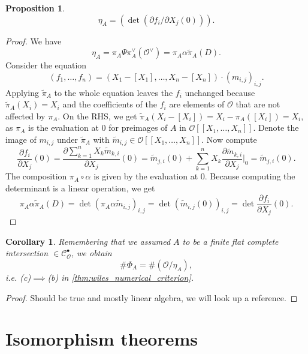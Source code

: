\documentclass{article}
\theoremstyle{plain}%
\newtheorem{proposition}{Proposition}[section]
\newtheorem{corollary}{Corollary}[section]
\theoremstyle{definition}
\theoremstyle{remark}
\newcommand{\cob}{\mathcal{C}_\mathcal{O}^\bullet}
\begin{document}
\begin{proposition}\cite[proposition 5.19]{darmon1995fermat}
    \[
        \eta_A = (\det(\partial f_i/\partial X_j(0))).
    \]
\end{proposition}
\begin{proof}
    We have \[
        \eta_A = \pi_A \Psi \pi_A^\vee(\mathcal{O}^\vee) = \pi_A\alpha \tilde \pi_A(D).
    \]
    Consider the equation
    \[
        (f_1, \dots, f_n) = (X_1 - [X_1], \dots, X_n - [X_n]) \cdot (m_{i,j})_{i,j}.
    \]
    Applying \(\tilde \pi_A\) to the whole equation leaves the \(f_i\) unchanged because \(\tilde \pi_A(X_i) = X_i\)
    and the coefficients of the \(f_i\) are elements of \(\mathcal{O}\) that are not affected by \(\pi_A\).
    On the RHS, we get \(\tilde \pi_A(X_i - [X_i]) = X_i - \pi_A([X_i]) = X_i\), as \(\pi_A\) 
    is the evaluation at \(0\) for preimages of \(A\) in \(\mathcal{O}[[X_1, \dots, X_n]]\).
    Denote the image of \(m_{i,j}\) under \(\tilde \pi_A\) with \(\tilde m_{i,j} \in \mathcal{O}[[X_1, \dots, X_n]]\).
    Now compute
    \[
        \frac{\partial f_i}{\partial X_j}(0) = \frac{\partial \sum_{k=1}^n X_k\tilde m_{k,i}}{\partial X_j}(0) 
        = \tilde m_{j,i}(0) + \sum_{k=1}^n X_k \frac{\partial \tilde m_{k,i}}{\partial X_j}\bigg|_{0} 
        = \tilde m_{j,i}(0).
    \]
    The composition \(\pi_A \circ \alpha\) is given by the evaluation at \(0\).
    Because computing the determinant is a linear operation, we get
    \[
        \pi_A \alpha \tilde \pi_A(D) = \det(\pi_A\alpha \tilde m_{i,j})_{i,j} = \det(\tilde m_{i,j}(0))_{i,j}
        = \det \frac{\partial f_i}{\partial X_j}(0).
    \]
\end{proof}

\begin{corollary}\cite[corollary 5.20]{darmon1995fermat}
    Remembering that we assumed \(A\) to be a finite flat complete intersection \(\in \cob\), we obtain
    \[
        \# \Phi_A = \# (\mathcal{O}/\eta_A),
    \]
    i.e. (c)\(\implies\)(b) in \cref{thm:wiles_numerical_criterion}.
\end{corollary}
\begin{proof}
    Should be true and mostly linear algebra, we will look up a reference.
\end{proof}

\section{Isomorphism theorems}
\end{document}
